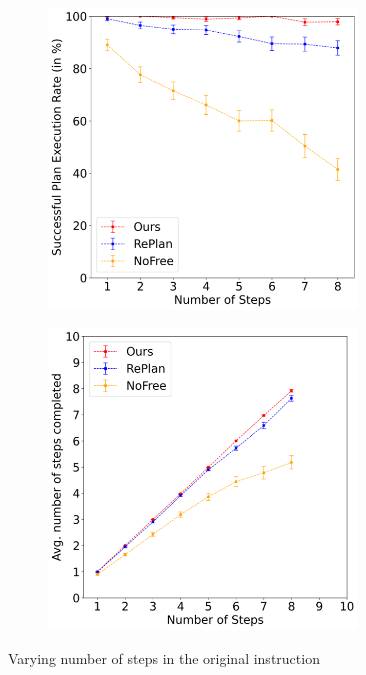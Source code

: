 \begin{figure}
    \begin{subfigure}{0.5\hsize}
       \centering    \includegraphics[width=0.9\textwidth]{assets/vary-steps-1.png}
    \end{subfigure}
    \begin{subfigure}{0.5\hsize}
       \centering    \includegraphics[width=0.9\textwidth]{assets/vary-steps-2.png}
    \end{subfigure}
    \caption{
        Varying number of steps in the original instruction
    }
    \label{fig:graphs-steps}
\end{figure}

